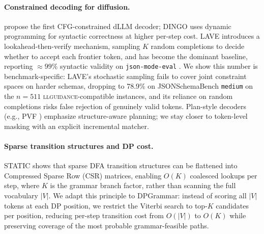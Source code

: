 \paragraph{Constrained decoding for diffusion.}
\citet{cd4dllm} propose the first CFG-constrained dLLM decoder; DINGO \citep{suresh2025dingoconstrainedinferencediffusion} uses dynamic programming for syntactic correctness at higher per-step cost. LAVE \citep{zhang2026lookaheadthenverifyreliableconstraineddecoding} introduces a lookahead-then-verify mechanism, sampling $K$ random completions to decide whether to accept each frontier token, and has become the dominant baseline, reporting ${\approx}99\%$ syntactic validity on \texttt{json-mode-eval} \citep{nousresearch2024jsonmodeeval}. We show this number is benchmark-specific: LAVE's stochastic sampling fails to cover joint constraint spaces on harder schemas, dropping to 78.9\% on JSONSchemaBench \citep{geng2025jsonschemabenchrigorousbenchmarkstructured} \texttt{medium} on the $n{=}511$ \textsc{llguidance}-compatible instances, and its reliance on random completions risks false rejection of genuinely valid tokens. Plan-style decoders (e.g., PVF \citep{li2026planverifyfillstructured}) emphasize structure-aware planning; we stay closer to token-level masking with an explicit incremental matcher.

\paragraph{Sparse transition structures and DP cost.}
STATIC \citep{su2026vectorizingtrieefficientconstrained} shows that sparse DFA transition structures can be flattened into Compressed Sparse Row (CSR) matrices, enabling $O(K)$ coalesced lookups per step, where $K$ is the grammar branch factor, rather than scanning the full vocabulary $|V|$. We adapt this principle to DPGrammar: instead of scoring all $|V|$ tokens at each DP position, we restrict the Viterbi search to top-$K$ candidates per position, reducing per-step transition cost from $O(|V|)$ to $O(K)$ while preserving coverage of the most probable grammar-feasible paths.


